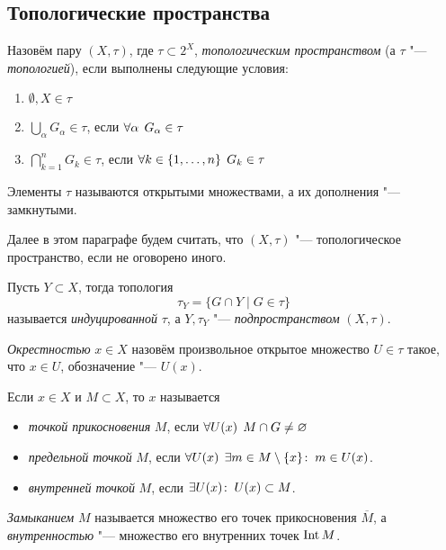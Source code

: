 \documentclass[main]{subfiles}
\begin{document}
\subsection{Топологические пространства}

\begin{definition}
  Назовём пару \( (X, \tau) \), где \( \tau \subset 2^X \),
  \emph{топологическим пространством}
  (а \( \tau \) "--- \emph{топологией}),
  если выполнены следующие условия:
  \begin{enumerate}
    \item \( \emptyset, X \in \tau \)
    \item \( \bigcup_\alpha G_\alpha \in \tau \), если
      \( \forall {\alpha} \; \, G_\alpha \in \tau \)
    \item \( \bigcap_{k = 1}^n G_k \in \tau \), если
      \( \forall {k \in \{ 1, \dots, n \}} \; \, G_k \in \tau \)
  \end{enumerate}
  Элементы \( \tau \) называются открытыми множествами,
  а их дополнения "--- замкнутыми.
\end{definition}

Далее в этом параграфе будем считать,
что \( (X, \tau) \) "--- топологическое пространство,
если не оговорено иного.

\begin{definition}
  Пусть \( Y \subset X \), тогда топология
  \[
    \tau_Y = \{ G \cap Y \mid G \in \tau \}
  \]
  называется \emph{индуцированной} \( \tau \),
  а \( Y, \tau_Y \) "--- \emph{подпространством} \( (X, \tau) \).
\end{definition}

\begin{definition}
  \emph{Окрестностью} \( x \in X \) назовём произвольное
  открытое множество \( U \in \tau \) такое,
  что \( x \in U \), обозначение "--- \( U(x) \).
\end{definition}

\begin{definition}
  Если \( x \in X \) и \( M \subset X \), то \( x \)
  называется
  \begin{itemize}
    \item \emph{точкой прикосновения} \( M \), если
      \( \forall {U(x)} \; \, M \cap G \ne \varnothing \)
    \item \emph{предельной точкой} \( M \), если
      \( \forall {U(x)} \; \, \exists m \in M \setminus \{ x \} \colon \: m \in U(x) \).
    \item \emph{внутренней точкой} \( M \), если
      \( \exists U(x) \colon \: U(x) \subset M \).
  \end{itemize}
  \emph{Замыканием} \( M \) называется множество его точек прикосновения
  \( \overline{M} \), а \emph{внутренностью} "--- множество его внутренних
  точек \( \operatorname{Int} M \).
\end{definition}
\end{document}
